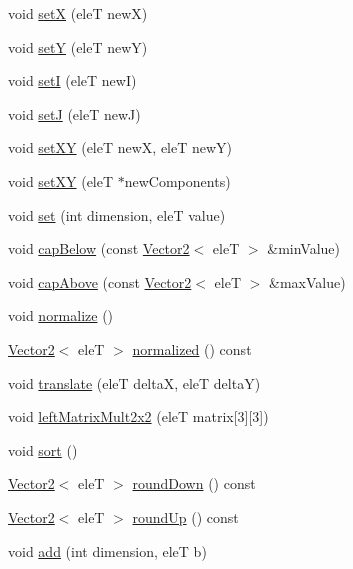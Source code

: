 \begin{DoxyCompactItemize}
void \hyperlink{classfc_1_1Vector2_a1e0a6cb9fe22295b81c7b8a91ba56c9e}{setX} (eleT newX)
\item 
void \hyperlink{classfc_1_1Vector2_a7244e0666c79cc618f917210f723ed98}{setY} (eleT newY)
\item 
void \hyperlink{classfc_1_1Vector2_adf4f9e486c5046d489d823b4f7c03a5d}{setI} (eleT newI)
\item 
void \hyperlink{classfc_1_1Vector2_a4923fcc5867390a449fcb4b93cb2d0c7}{setJ} (eleT newJ)
\item 
void \hyperlink{classfc_1_1Vector2_a5aec5245348bcf0d5e5dda71b9178001}{set\+XY} (eleT newX, eleT newY)
\item 
void \hyperlink{classfc_1_1Vector2_aa1cd5ea9938c8b31a102f02024163c9d}{set\+XY} (eleT $\ast$new\+Components)
\item 
void \hyperlink{classfc_1_1Vector2_aa89e17ff440cc8f05a7b537f78ba91cf}{set} (int dimension, eleT value)
\item 
void \hyperlink{classfc_1_1Vector2_a045f037481473f7cd9abe09f8b552021}{cap\+Below} (const \hyperlink{classfc_1_1Vector2}{Vector2}$<$ eleT $>$ \&min\+Value)
\item 
void \hyperlink{classfc_1_1Vector2_a62c8f4a3f1909857834e5cc9e8342574}{cap\+Above} (const \hyperlink{classfc_1_1Vector2}{Vector2}$<$ eleT $>$ \&max\+Value)
\item 
void \hyperlink{classfc_1_1Vector2_a5d08f50cf4fbb34744a0c31ad9b591e6}{normalize} ()
\item 
\hyperlink{classfc_1_1Vector2}{Vector2}$<$ eleT $>$ \hyperlink{classfc_1_1Vector2_a567f189a7a5f7871f0648d241e81f7ee}{normalized} () const
\item 
void \hyperlink{classfc_1_1Vector2_aceb03f4c1b057710fbb95d0b29c11e1b}{translate} (eleT deltaX, eleT deltaY)
\item 
void \hyperlink{classfc_1_1Vector2_a8509e8227671890c432f39cb66d1940c}{left\+Matrix\+Mult2x2} (eleT matrix\mbox{[}3\mbox{]}\mbox{[}3\mbox{]})
\item 
void \hyperlink{classfc_1_1Vector2_a493e8fb804b1943a4878afb4191f8fb6}{sort} ()
\item 
\hyperlink{classfc_1_1Vector2}{Vector2}$<$ eleT $>$ \hyperlink{classfc_1_1Vector2_aa9501d6580d5a78bf1573b23019b8821}{round\+Down} () const
\item 
\hyperlink{classfc_1_1Vector2}{Vector2}$<$ eleT $>$ \hyperlink{classfc_1_1Vector2_ae782de3d87d058ec441aa872348340b2}{round\+Up} () const
\item 
void \hyperlink{classfc_1_1Vector2_a7bc6143a3005d1b8ff35bea3c3f89c3d}{add} (int dimension, eleT b)

\end{DoxyCompactItemize}
